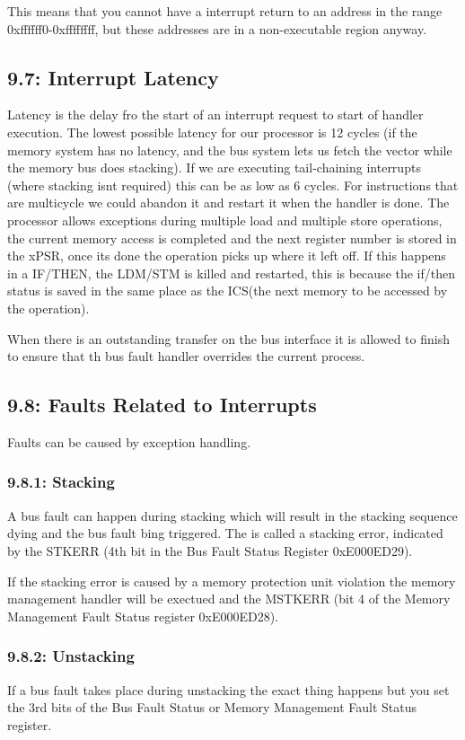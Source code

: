 \documentclass[12pt]{article}
\begin{document}
This means that you cannot have a interrupt return to an address in the range 0xffffff0-0xffffffff, but these addresses are in a non-executable region anyway.

\subsection*{9.7: Interrupt Latency}
Latency is the delay fro the start of an interrupt request to start of handler execution. The lowest possible latency for our processor is 12 cycles (if the memory system has no latency, and the bus system lets us fetch the vector while the memory bus does stacking). If we are executing tail-chaining interrupts (where stacking isnt required) this can be as low as 6 cycles. For instructions that are multicycle we could abandon it and restart it when the handler is done. The processor allows exceptions during multiple load and multiple store operations, the current memory access is completed and the next register number is stored in the xPSR, once its done the operation picks up where it left off. If this happens in a IF/THEN, the LDM/STM  is killed and restarted, this is because the if/then status is saved in the same place as the ICS(the next memory to be accessed by the operation).

When there is an outstanding transfer on the bus interface it is allowed to finish to ensure that th bus fault handler overrides the current process.

\subsection*{9.8: Faults Related to Interrupts}
Faults can be caused by exception handling.
\subsubsection*{9.8.1: Stacking}
A bus fault can happen during stacking which will result in the stacking sequence dying and the bus fault bing triggered. The is called a stacking error, indicated by the STKERR (4th bit in the Bus Fault Status Register 0xE000ED29).

If the stacking error is caused by a memory protection unit violation the memory management handler will be exectued and the MSTKERR (bit 4 of the Memory Management Fault Status register 0xE000ED28).

\subsubsection*{9.8.2: Unstacking}
If a bus fault takes place during unstacking the exact thing happens but you set the 3rd bits of the Bus Fault Status or Memory Management Fault Status register.
\end{document}
